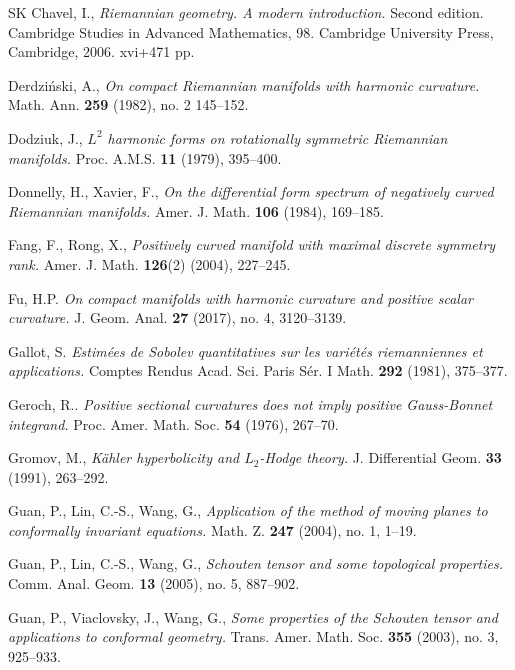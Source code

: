 \documentclass[12pt, twoside]{article}
\theoremstyle{definition}
\numberwithin{equation}{section}
\begin{document}
\begin{thebibliography}{SK}
	 Chavel, I.,
	 \textit{Riemannian geometry. A modern introduction.} Second edition. Cambridge Studies in Advanced Mathematics, 98. Cambridge University Press, Cambridge, 2006. xvi+471 pp. 

Derdzi\'{n}ski, A., 
\textit{On compact Riemannian manifolds with harmonic curvature.}
Math. Ann. \textbf{259} (1982), no. 2 145--152.

	
	Dodziuk, J.,
	\textit{$L^{2}$ harmonic forms on rotationally symmetric Riemannian manifolds.} 
	Proc. A.M.S. \textbf{11} (1979), 395--400.
	
	Donnelly, H., Xavier, F.,
	\textit{On the differential form spectrum of negatively curved Riemannian manifolds.}
	Amer. J. Math. \textbf{106} (1984), 169--185.
	
	

	Fang, F., Rong, X.,
	\textit{Positively curved manifold with maximal discrete symmetry rank.}
	Amer. J. Math. \textbf{126}(2) (2004), 227--245. 
	
	Fu, H.P.
	\textit{On compact manifolds with harmonic curvature and positive scalar curvature.} 
	J. Geom. Anal. \textbf{27} (2017), no. 4, 3120--3139. 
	
	Gallot, S.
	\textit{Estim\'{e}es de Sobolev quantitatives sur les vari\'{e}t\'{e}s riemanniennes et applications.}
	Comptes Rendus Acad. Sci. Paris S\'{e}r. I Math. \textbf{292} (1981), 375--377.
	
	
	Geroch, R..
	\textit{Positive sectional curvatures does not imply positive Gauss-Bonnet integrand.}
	Proc. Amer. Math. Soc. \textbf{54} (1976), 267--70.
	
	Gromov, M.,
	\textit{K\"{a}hler hyperbolicity and $L_{2}$-Hodge theory.}
	J. Differential Geom. \textbf{33} (1991), 263--292.
	
	
	Guan, P.,  Lin, C.-S., Wang, G.,
	\textit{Application of the method of moving planes to conformally invariant equations.}
	Math. Z. \textbf{247} (2004), no. 1, 1--19. 
	
	Guan, P.,  Lin, C.-S., Wang, G.,
	\textit{Schouten tensor and some topological properties.}
	Comm. Anal. Geom. \textbf{13} (2005), no. 5, 887--902.
	
	Guan, P., Viaclovsky, J., Wang, G.,
	\textit{Some properties of the Schouten tensor and applications to conformal geometry.}
	Trans. Amer. Math. Soc. \textbf{355} (2003), no. 3, 925--933. 
	

\end{thebibliography}
\end{document}
